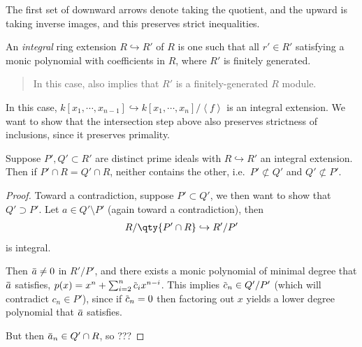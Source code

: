 The first set of downward arrows denote taking the quotient, and the
upward is taking inverse images, and this preserves strict inequalities.

\begin{definition}

An \emph{integral} ring extension \(R\hookrightarrow R'\) of \(R\) is
one such that all \(r' \in R'\) satisfying a monic polynomial with
coefficients in \(R\), where \(R'\) is finitely generated.

\begin{quote}
In this case, also implies that \(R'\) is a finitely-generated \(R\)
module.
\end{quote}

\end{definition}

In this case,
\(k[x_1, \cdots, x_{n-1}] \hookrightarrow k[x_1, \cdots, x_{n}] /\left\langle{f}\right\rangle\)
is an integral extension. We want to show that the intersection step
above also preserves strictness of inclusions, since it preserves
primality.

\begin{lemma}

Suppose \(P', Q' \subset R'\) are distinct prime ideals with
\(R\hookrightarrow R'\) an integral extension. Then if
\(P'\cap R = Q'\cap R\), neither contains the other,
i.e.~\(P'\not\subset Q'\) and \(Q'\not\subset P'\).

\end{lemma}

\begin{proof}

Toward a contradiction, suppose \(P' \subset Q'\), we then want to show
that \(Q'\supset P'\). Let \(a\in Q'\setminus P'\) (again toward a
contradiction), then
\begin{align*}  
R/\qty{P'\cap R} \hookrightarrow R'/P'
\end{align*}
is integral.

Then
\(\mkern 1.5mu\overline{\mkern-1.5mua\mkern-1.5mu}\mkern 1.5mu \neq 0\)
in \(R'/P'\), and there exists a monic polynomial of minimal degree that
\(\mkern 1.5mu\overline{\mkern-1.5mua\mkern-1.5mu}\mkern 1.5mu\)
satisfies,
\(p(x) = x^n + \sum_{i=2}^n \mkern 1.5mu\overline{\mkern-1.5muc\mkern-1.5mu}\mkern 1.5mu_i x^{n-i}\).
This implies
\(\mkern 1.5mu\overline{\mkern-1.5muc\mkern-1.5mu}\mkern 1.5mu_n \in Q'/P'\)
(which will contradict \(c_n \in P'\)), since if
\(\mkern 1.5mu\overline{\mkern-1.5muc\mkern-1.5mu}\mkern 1.5mu_n = 0\)
then factoring out \(x\) yields a lower degree polynomial that
\(\mkern 1.5mu\overline{\mkern-1.5mua\mkern-1.5mu}\mkern 1.5mu\)
satisfies.

But then
\(\mkern 1.5mu\overline{\mkern-1.5mua\mkern-1.5mu}\mkern 1.5mu_n \in Q'\cap R\),
so ???

\end{proof}


